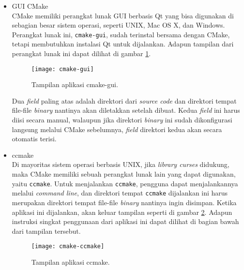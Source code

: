 \begin{enumerate}
	\begin{itemize}
		\item GUI CMake\\
		CMake memiliki perangkat lunak GUI berbasis Qt yang bisa digunakan di sebagian besar sistem operasi, seperti UNIX, Mac OS X, dan Windows. Perangkat lunak ini, \verb|cmake-gui|, sudah terinstal bersama dengan CMake, tetapi membutuhkan instalasi Qt untuk dijalankan. Adapun tampilan dari perangkat lunak ini dapat dilihat di gambar \ref{fig:cmake-gui}.
		
		\begin{figure}[ht]
		    \centering
		    \texttt{[image: cmake-gui]}
		    \caption[Tampilan aplikasi cmake-gui]{Tampilan aplikasi cmake-gui.\protect\footnotemark}
		    \label{fig:cmake-gui}
		\end{figure}
		
		Dua \textit{field} paling atas adalah direktori dari \textit{source code} dan direktori tempat file-file \textit{binary} nantinya akan diletakkan setelah dibuat. Kedua \textit{field} ini harus diisi secara manual, walaupun jika direktori \textit{binary} ini sudah dikonfigurasi langsung melalui CMake sebelumnya, \textit{field} direktori kedua akan secara otomatis terisi.
		\item ccmake\\
		Di mayoritas sistem operasi berbasis UNIX, jika \textit{library curses}	didukung, maka CMake memiliki sebuah perangkat lunak lain yang dapat digunakan, yaitu \verb|ccmake|. Untuk menjalankan \verb|ccmake|, pengguna dapat menjalankannya melalui \textit{command line}, dan direktori tempat \verb|ccmake| dijalankan ini harus merupakan direktori tempat file-file \textit{binary} nantinya ingin disimpan. Ketika aplikasi ini dijalankan, akan keluar tampilan seperti di gambar \ref{fig:cmake-ccmake}. Adapun instruksi singkat penggunaan dari aplikasi ini dapat dilihat di bagian bawah dari tampilan tersebut.
		
		\begin{figure}[ht]
		    \centering
		    \texttt{[image: cmake-ccmake]}
		    \caption[Tampilan aplikasi ccmake]{Tampilan aplikasi ccmake.\protect\footnotemark}
		    \label{fig:cmake-ccmake}
		\end{figure}
		

\end{itemize}
\end{enumerate}

